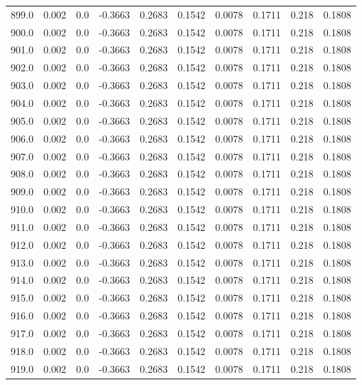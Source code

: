 \begin{longtable}{lrrrrrrrrr}
899.0 & 0.002 & 0.0 & -0.3663 & 0.2683 & 0.1542 & 0.0078 & 0.1711 & 0.218 & 0.1808 \\
900.0 & 0.002 & 0.0 & -0.3663 & 0.2683 & 0.1542 & 0.0078 & 0.1711 & 0.218 & 0.1808 \\
901.0 & 0.002 & 0.0 & -0.3663 & 0.2683 & 0.1542 & 0.0078 & 0.1711 & 0.218 & 0.1808 \\
902.0 & 0.002 & 0.0 & -0.3663 & 0.2683 & 0.1542 & 0.0078 & 0.1711 & 0.218 & 0.1808 \\
903.0 & 0.002 & 0.0 & -0.3663 & 0.2683 & 0.1542 & 0.0078 & 0.1711 & 0.218 & 0.1808 \\
904.0 & 0.002 & 0.0 & -0.3663 & 0.2683 & 0.1542 & 0.0078 & 0.1711 & 0.218 & 0.1808 \\
905.0 & 0.002 & 0.0 & -0.3663 & 0.2683 & 0.1542 & 0.0078 & 0.1711 & 0.218 & 0.1808 \\
906.0 & 0.002 & 0.0 & -0.3663 & 0.2683 & 0.1542 & 0.0078 & 0.1711 & 0.218 & 0.1808 \\
907.0 & 0.002 & 0.0 & -0.3663 & 0.2683 & 0.1542 & 0.0078 & 0.1711 & 0.218 & 0.1808 \\
908.0 & 0.002 & 0.0 & -0.3663 & 0.2683 & 0.1542 & 0.0078 & 0.1711 & 0.218 & 0.1808 \\
909.0 & 0.002 & 0.0 & -0.3663 & 0.2683 & 0.1542 & 0.0078 & 0.1711 & 0.218 & 0.1808 \\
910.0 & 0.002 & 0.0 & -0.3663 & 0.2683 & 0.1542 & 0.0078 & 0.1711 & 0.218 & 0.1808 \\
911.0 & 0.002 & 0.0 & -0.3663 & 0.2683 & 0.1542 & 0.0078 & 0.1711 & 0.218 & 0.1808 \\
912.0 & 0.002 & 0.0 & -0.3663 & 0.2683 & 0.1542 & 0.0078 & 0.1711 & 0.218 & 0.1808 \\
913.0 & 0.002 & 0.0 & -0.3663 & 0.2683 & 0.1542 & 0.0078 & 0.1711 & 0.218 & 0.1808 \\
914.0 & 0.002 & 0.0 & -0.3663 & 0.2683 & 0.1542 & 0.0078 & 0.1711 & 0.218 & 0.1808 \\
915.0 & 0.002 & 0.0 & -0.3663 & 0.2683 & 0.1542 & 0.0078 & 0.1711 & 0.218 & 0.1808 \\
916.0 & 0.002 & 0.0 & -0.3663 & 0.2683 & 0.1542 & 0.0078 & 0.1711 & 0.218 & 0.1808 \\
917.0 & 0.002 & 0.0 & -0.3663 & 0.2683 & 0.1542 & 0.0078 & 0.1711 & 0.218 & 0.1808 \\
918.0 & 0.002 & 0.0 & -0.3663 & 0.2683 & 0.1542 & 0.0078 & 0.1711 & 0.218 & 0.1808 \\
919.0 & 0.002 & 0.0 & -0.3663 & 0.2683 & 0.1542 & 0.0078 & 0.1711 & 0.218 & 0.1808 \\

\end{longtable}
